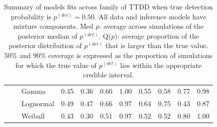 \documentclass[useAMS,usenatbib,referee,12pt]{article}
\newcommand{\pdet}{p^{(det)}}
\begin{document}
\begin{table}[ht]
\begin{tabular}{l|l|l|cccc|cccc}
\cline{2-11}
& \parbox[t]{2mm}{} & Gamma & 0.45 & 0.36 & 0.60 & 1.00 & 0.55 & 0.58 & 0.77 & 0.98 \\ 
   &  & Lognormal & 0.49 & 0.47 & 0.66 & 0.97 & 0.64 & 0.75 & 0.43 & 0.87 \\ 
   &  & Weibull & 0.43 & 0.30 & 0.51 & 0.97 & 0.52 & 0.52 & 0.80 & 1.00 \\ 
   \hline
\end{tabular}
\caption{Summary of models fits across family of TTDD when true detection probability is $\pdet = 0.50$.
All data and inference models have mixture components.
Med $p$: average across simulations of the posterior median of $\pdet$.  
Q($p$): average proportion of the posterior distribution of $\pdet$ that is larger than the true value.  
50\% and 90\% coverage is expressed as the proportion of simulations for which the true value of $\pdet$ lies within the appropriate credible interval.}


\vspace{0.5cm}


\end{table}
\end{document}
